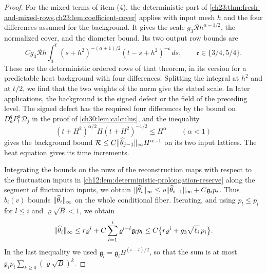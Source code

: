 \begin{proof}
For the mixed terms of item (4), the deterministic part of \cref{ch23:thm:fresh-and-mixed-rows,ch23:lem:coefficient-cover} applies with input mesh $h$ and the four differences assumed for the background. It gives the scale $g_3\mathcal Rh^{\alpha-1/2}$, the normalized cover, and the diameter bound. Its two output row bounds are
\begin{equation}\label{ch30:eq:mixed-rows}
 Cg_3\mathcal Rh\int_0^t(s+h^2)^{-(\alpha+1)/2}(t-s+h^2)^{-\mathfrak e}\,ds,\qquad \mathfrak e\in\{3/4,5/4\}.
\end{equation}
These are the deterministic ordered rows of that theorem, in its version for a predictable heat background with four differences. Splitting the integral at $h^2$ and at $t/2$, we find that the two weights of the norm give the stated scale. In later applications, the background is the signed defect or the field of the preceding level. The signed defect has the required four differences by the bound on $D_a^qP_t^a\mathscr D_j$ in the proof of \cref{ch30:lem:calculus}, and the inequality
\[
 (t+H^2)^{\alpha/2}H(t+H^2)^{-1/2}\le H^\alpha\qquad(\alpha<1)
\]
gives the background bound $\mathcal R\le C\lVert \widehat\theta_{j-1}\rVert_\infty H^{\alpha-1}$ on its two input lattices. The heat equation gives its time increments.

Integrating the bounds on the rows of the reconstruction maps with respect to the fluctuation inputs in \cref{ch12:lem:deterministic-prolongation-reserve} along the segment of fluctuation inputs, we obtain $\lVert \widehat\theta_i\rVert_\infty\le\varrho\lVert \widehat\theta_{i-1}\rVert_\infty+C\mathfrak g_ip_i$. Thus $b_i(v)$ bounds $\lVert \widehat\theta_i\rVert_\infty$ on the whole conditional fiber. Iterating, and using $p_l\le p_i$ for $l\le i$ and $\varrho\sqrt B<1$, we obtain
\begin{equation}\label{ch30:eq:support-cap}
 \lVert \widehat\theta_i\rVert_\infty
 \le r\varrho^i+C\sum_{l=1}^i\varrho^{i-l}\mathfrak g_lp_l
 \le C\bigl\{r\varrho^i+g_3\sqrt{\ell_i}\,p_i\bigr\}.
\end{equation}
In the last inequality we used $\mathfrak g_l=\mathfrak g_iB^{(i-l)/2}$, so that the sum is at most $\mathfrak g_ip_i\sum_{k\ge0}(\varrho\sqrt B)^k$.


\end{proof}
